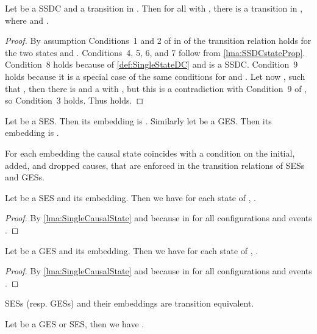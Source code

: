 \documentclass[runningheads,a4paper]{llncs}
\begin{document}
\begin{lemma}
\label{lma:SSDCConfInTrans}
Let  be a SSDC and  a transition in . Then for all  with , there is a transition  in , where  and .
\end{lemma}

\begin{proof}
By assumption Conditions~1 and 2 of  in \cite{dynamicCausality15} of the
transition relation holds for the two states  and
. Conditions~4,
5, 6, and
7 follow from \lem\ref{lma:SSDCstateProp}.
Condition~8 holds because of \ref{def:SingleStateDC} and  is a SSDC. Condition~9 holds because it is a special case of the same conditions for  and . Let now , such that , then there is  and a  with , but this is a contradiction with Condition~9 of , so Condition~3 holds. Thus  holds.
\end{proof}

\begin{definition}
\label{def:InclusionIntoDCES}
Let  be a SES. Then its embedding is . Similarly let  be a GES. Then its embedding is .
\end{definition}

For each embedding the causal state coincides with a condition on the initial, added, and dropped causes, that are enforced in the transition relations of SESs and GESs.

\begin{lemma}
\label{lma:explicitSEScs}
Let  be a SES and  its embedding. Then we have for each state  of , .
\end{lemma}

\begin{proof}
By \lem\ref{lma:SingleCausalState} and because  in  for all configurations  and events .
\end{proof}

\begin{lemma}
\label{lma:explicitGEScs}
Let  be a GES and  its embedding. Then we have for each state  of ,  .
\end{lemma}

\begin{proof}
By \lem\ref{lma:SingleCausalState} and because  in  for all configurations  and events .
\end{proof}
SESs (resp. GESs) and their embeddings are transition equivalent.
\begin{lemma}
\label{lma:SESinDCES}
\label{lma:GESinDCES}
Let  be a GES or SES, then we have .
\end{lemma}
\end{document}
